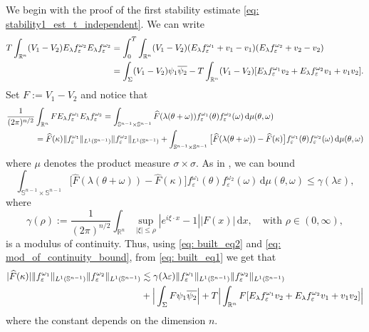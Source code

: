 \documentclass[10pt,a4paper]{amsart}
\theoremstyle{remark}
\theoremstyle{definition}
\newcommand{\R}{\mathbb{R}}
\newcommand{\Sph}{\mathbb{S}}
\newcommand{\dd}{\mathrm{d}}
\newcommand{\om}{\omega}
\def\ve{\varepsilon}
\def\lec{\lesssim}
\def\wh{\widehat}
\def\ovl{\overline}
\begin{document}
%
%
We begin with the proof of the first stability estimate \eqref{eq: stability1_est_t_independent}.
We can write
%
\begin{align}
%
T\int_{\R^n} (V_1-V_2) E_\lambda f^{\om_2}_\ve E_\lambda f^{\om_2}_\ve &= 
\int_0^T \int_{\R^n} (V_1-V_2) (E_\lambda f^{\om_1}_\ve + v_1 - v_1) (E_\lambda f^{\om_2}_\ve + v_2 - v_2) \notag \\
%
&= \int_\Sigma (V_1-V_2) \psi_1 \ovl{\psi_2} 
- T\int_{\R^n} (V_1-V_2)[ E_\lambda f^{\om_1}_\ve v_2 + E_\lambda f^{\om_2}_\ve v_1 + v_1 v_2] \label{eq: built_eq1}.
%
\end{align}
%
Set $F:= V_1 - V_2$ and notice that 
%
\begin{align}
%
\frac{1}{(2\pi)^{n/2}} &\int_{\R^n} F E_\lambda f^{\om_1}_\ve E_\lambda f^{\om_2}_\ve =
 \int_{\Sph^{n-1}\times\Sph^{n-1}} \wh{F}(\lambda(\theta+\om)) f^{\om_1}_\ve (\theta) f^{\om_2}_\ve(\om)\, \dd\mu(\theta, \om) \notag\\
&= \wh{F}(\kappa) \|f^{\om_1}_\ve\|_{L^1(\Sph^{n-1})}\|f^{\om_2}_\ve\|_{L^1(\Sph^{n-1})} 
+ \int_{\Sph^{n-1}\times\Sph^{n-1}}\big[ \wh{F}(\lambda(\theta+\om)) - \wh{F}(\kappa)\big] f^{\om_1}_\ve (\theta) f^{\om_2}_\ve(\om)
\, \dd\mu(\theta, \om) \label{eq: built_eq2}
%
\end{align}
%
where $\mu$ denotes the product measure $\sigma\times \sigma$. As in \cite{zbMATH08122191}, we can bound 
%
\begin{equation}\label{eq: mod_of_continuity_bound}
 \int_{\Sph^{n-1}\times\Sph^{n-1}}\big[ \wh{F}(\lambda(\theta+\om)) - \wh{F}(\kappa)\big] f^{\om_1}_\ve (\theta) f^{\om_2}_\ve(\om)
\, \dd\mu(\theta, \om)  
\leq \gamma(\lambda \ve),
\end{equation}
%
where
%
\[
\gamma(\rho):= \frac{1}{(2\pi)^{n/2}} \int_{\R^n} \sup_{|\xi|\leq\rho} |e^{i\xi\cdot x}-1||F(x)|\, \dd x, \quad \text{with} \,\, \rho\in(0, \infty),
\]
%
is a modulus of continuity. Thus, using \eqref{eq: built_eq2} and \eqref{eq: mod_of_continuity_bound}, from \eqref{eq: built_eq1} we get that 
%
\begin{align}
%
|\wh{F}(\kappa)| \|f^{\om_1}_\ve\|_{L^1(\Sph^{n-1})}\|f^{\om_2}_\ve\|_{L^1(\Sph^{n-1})} &\lec   
\gamma(\lambda \ve) \|f^{\om_1}_\ve\|_{L^1(\Sph^{n-1})}\|f^{\om_2}_\ve\|_{L^1(\Sph^{n-1})}  \notag \\
%
&+ \Big| \int_\Sigma F \psi_1 \ovl{\psi_2} \Big|  
+ T\Big| \int_{\R^n} F [E_\lambda f^{\om_1}_\ve v_2 + E_\lambda f^{\om_2}_\ve v_1 + v_1 v_2] \Big| 
\label{eq: FT_stability_estimate}
%
\end{align}
%
where the constant depends on the dimension $n$. 
\end{document}
